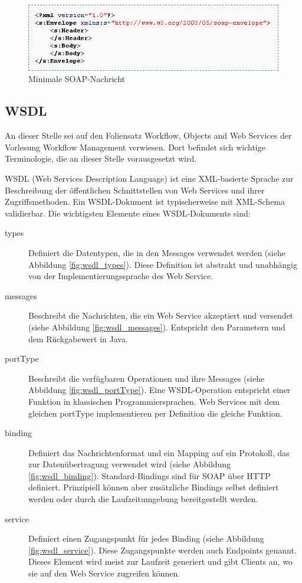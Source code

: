 \documentclass[runningheads]{llncs}
\newcommand{\germanquote}[1]{\glqq{}#1\grqq{}}
\begin{document}
    \begin{figure}[ht!]
      \centering
      \includegraphics[width=\textwidth]{../images/min_soap.png}
      \caption{Minimale SOAP-Nachricht}
      \label{fig:min_soap}
    \end{figure}


  \subsection{WSDL}
  \label{wsdl}
  \nocite{wk_wsdl}
  \nocite{tut_wsdl}
    An dieser Stelle sei auf den Foliensatz \germanquote{Workflow, Objects and Web
    Ser\-vi\-ces}\cite{wfm_ch7} der Vorlesung \germanquote{Workflow Management}\cite{wfm_site}
    verwiesen. Dort befindet sich wichtige Terminologie, die an dieser Stelle vorausgesetzt wird.

    WSDL (Web Services Description Language) ist eine XML-basierte Sprache zur Beschreibung der
    öffentlichen Schnittstellen von Web Services und ihrer Zugriffsmethoden. Ein WSDL-Dokument ist
    typischerweise mit XML-Schema validierbar. Die wichtigsten Elemente eines WSDL-Dokuments sind:
    \begin{description}
      \item[types]
        Definiert die Datentypen, die in den Messages verwendet werden (siehe Abbildung
        \ref{fig:wsdl_types}). Diese Definition ist abstrakt und unabhängig von der
        Implementierungssprache des Web Service.
      \item[messages]
        Beschreibt die Nachrichten, die ein Web Service akzeptiert und versendet (siehe Abbildung
        \ref{fig:wsdl_messages}). Entspricht den Parametern und dem Rückgabewert in Java.
      \item[portType]
        Beschreibt die verfügbaren Operationen und ihre Messages (siehe Abbildung
        \ref{fig:wsdl_portType}). Eine WSDL-Operation entspricht einer Funktion in klassischen
        Programmiersprachen. Web Services mit dem gleichen portType implementieren per Definition
        die gleiche Funktion.
      \item[binding]
        Definiert das Nachrichtenformat und ein Mapping auf ein Protokoll, das zur Datenübertragung
        verwendet wird (siehe Abbildung \ref{fig:wsdl_binding}). Standard-Bindings sind für SOAP
        über HTTP definiert. Prinzipiell können aber zusätzliche Bindings selbst definiert werden
        oder durch die Laufzeitumgebung bereitgestellt werden.
      \item[service]
        Definiert einen Zugangspunkt für jedes Binding (siehe Abbildung \ref{fig:wsdl_service}).
        Diese Zugangspunkte werden auch \germanquote{Endpoints} genannt. Dieses Element wird meist
        zur Laufzeit generiert und gibt Clients an, wo sie auf den Web Service zugreifen können.
     \end{description}
\end{document}
